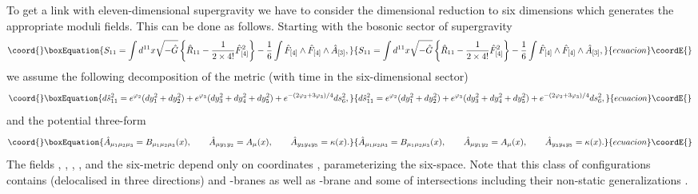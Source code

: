 \documentclass[a4paper,12pt]{article}
\begin{document}
To get a link with eleven-dimensional supergravity we have to
consider the dimensional reduction to six dimensions which
generates the appropriate moduli fields. This can be done as
follows. Starting with the bosonic sector of \coordHE{} supergravity
\begin{equation}\coord{}\boxEquation{\label{11d}
S_{11} = \int d^{11} x \sqrt{-\hat G} \left\{ \hat R_{11} -
\frac1{2\times 4!} \hat F_{[4]}^2 \right\} - \frac16 \int \hat
F_{[4]} \wedge \hat F_{[4]} \wedge \hat A_{[3]},
}{S_{11} = \int d^{11} x \sqrt{-\hat G} \left\{ \hat R_{11} -
\frac1{2\times 4!} \hat F_{[4]}^2 \right\} - \frac16 \int \hat
F_{[4]} \wedge \hat F_{[4]} \wedge \hat A_{[3]},
}{ecuacion}\coordE{}\end{equation}
we assume the following \coordHE{} decomposition of the metric
(with time in the six-dimensional sector)
\begin{equation}\coord{}\boxEquation{\label{ANZ}
d \hat s_{11}^2 = e^{\varphi_2}(dy_1^2+dy_2^2) + e^{\varphi_3}
(dy_3^2+dy_4^2+dy_5^2) + e^{-(2\varphi_2+3\varphi_3)/4} ds^2_{6},
}{d \hat s_{11}^2 = e^{\varphi_2}(dy_1^2+dy_2^2) + e^{\varphi_3}
(dy_3^2+dy_4^2+dy_5^2) + e^{-(2\varphi_2+3\varphi_3)/4} ds^2_{6},
}{ecuacion}\coordE{}\end{equation}
and  the potential three-form
\begin{equation}\coord{}\boxEquation{
\hat A_{\mu_1\mu_2\mu_3} = B_{\mu_1\mu_2\mu_3}(x), \qquad \hat
A_{\mu y_1 y_2} = A_{\mu}(x), \qquad \hat A_{y_3y_4y_5} =
\kappa(x).
}{
\hat A_{\mu_1\mu_2\mu_3} = B_{\mu_1\mu_2\mu_3}(x), \qquad \hat
A_{\mu y_1 y_2} = A_{\mu}(x), \qquad \hat A_{y_3y_4y_5} =
\kappa(x).
}{ecuacion}\coordE{}\end{equation}
The fields \coordHE{}, \coordHE{}, \coordHE{}, \coordHE{},
\myHighlight{$\kappa$}\coordHE{} and the six-metric \coordHE{}
depend only on coordinates \coordHE{}, parameterizing the
six-space. Note that this class of configurations contains \coordHE{}
(delocalised in three directions) and \coordHE{}-branes as well as
\coordHE{}-brane \cite{Lam96,Pa96} and some of intersections
\cite{Co96a,Co96b,Co97} including their non-static
generalizations \cite{ChGaSh00}.
\end{document}
